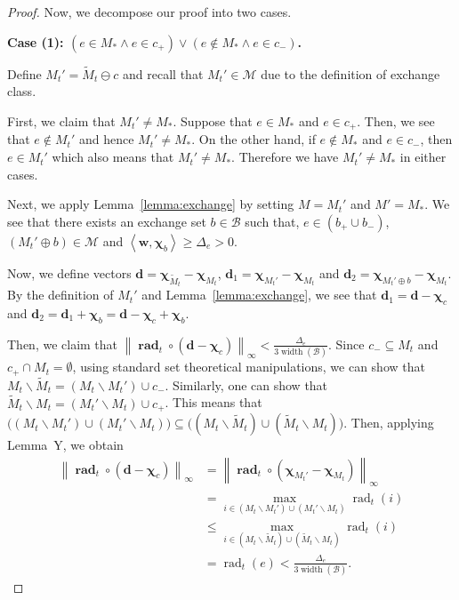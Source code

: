 \documentclass{article}
\newcommand{\M}{\mathcal M}
\newcommand{\B}{\mathcal B}
\newcommand{\del}{\backslash}
\DeclareMathOperator{\rank}{width}
\DeclareMathOperator{\rad}{rad}
\newcommand{\inn}[1]{\left\langle #1 \right\rangle}
\newcommand{\nor}[1]{\left\|#1\right\|}
\renewcommand{\vec}[1]{\boldsymbol{#1}}
\renewcommand{\odot}{\circ}
\begin{document}
\begin{spacing}{1.1}
\begin{proof}

Now, we decompose our proof into two cases.

\textbf{Case (1): $(e \in M_* \wedge e\in c_+) \vee (e \not \in M_* \wedge e\in c_-)$.}

Define $M_t' = \tilde M_t \ominus c$ and recall that $M_t' \in \M$ due to the definition of exchange class.

First, we claim that $M_t'\not= M_*$.
Suppose that $e\in M_*$ and $e\in c_+$.
Then, we see that $e\not\in M_t'$ and hence $M_t'\not=M_*$.
On the other hand, if $e\not \in M_*$ and $e\in c_-$, then $e\in M_t'$ which also means that $M_t'\not= M_*$.
Therefore we have $M_t'\not=M_*$ in either cases.


Next, we apply Lemma~\ref{lemma:exchange} by setting $M=M_t'$ and $M'=M_*$.
We see that there exists an exchange set $b\in \B$ such that, $e\in (b_+\cup b_-)$, $(M_t' \oplus b) \in \M$ and
 $\inn{\vec w, \vec \chi_b} \ge \Delta_e > 0$.
 
Now, we define vectors $\vec d = \vec \chi_{\tilde M_t} - \vec \chi_{M_t}$, $\vec d_1 = \vec\chi_{M_t'}-\vec\chi_{M_t}$ and $\vec d_2 = \vec\chi_{M_t'\oplus b}-\vec\chi_{M_t}$.
By the definition of $M_t'$ and Lemma~\ref{lemma:exchange}, we see that $\vec d_1 = \vec d - \vec \chi_{c}$ and $\vec d_2 = \vec d_1+\vec \chi_b = \vec d-\vec \chi_c+\vec \chi_b$.


Then, we claim that $\nor{\vec \rad_t \odot (\vec d-\vec \chi_c)}_\infty < \frac{\Delta_e}{3\rank(\B)}$.
Since $c_-\subseteq M_t$ and $c_+\cap M_t = \emptyset$, using standard set theoretical manipulations, we can show that $M_t \del \tilde M_t= (M_t \del M_t') \cup c_-$. 
Similarly, one can show that $\tilde M_t \del M_t = (M_t' \del M_t) \cup c_+$. 
This means that $\big((M_t \del M_t') \cup (M_t'\del M_t)\big) \subseteq \big((M_t \del \tilde M_t ) \cup (\tilde M_t \del M_t)\big)$.
Then, applying Lemma~Y, we obtain
\begin{align}
   \nor{\vec \rad_t \odot (\vec d-\vec\chi_c)}_\infty 
   &= \nor{\vec \rad_t \odot (\vec \chi_{M_t'} - \vec\chi_{M_t})}_\infty \nonumber\\
   &= \max_{i\in (M_t \del M_t') \cup (M_t'\del M_t) } \rad_t(i) \nonumber \\
   &\le \max_{i\in (M_t \del \tilde M_t ) \cup (\tilde M_t \del M_t)}  \rad_t(i) \nonumber \\
   & = \rad_t(e) < \frac{\Delta_e}{3\rank(\B)} \label{eq:u-c-1-0}.
\end{align}


\end{proof}
\end{spacing}
\end{document}
